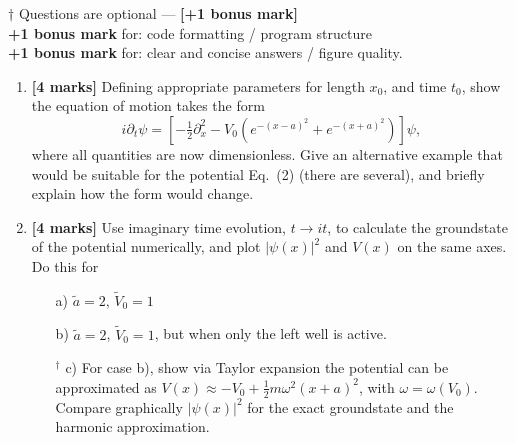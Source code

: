 \documentclass[11pt]{article}
\begin{document}
{\footnotesize{$\dagger$ Questions are optional  --- \textbf{[+1 bonus mark]} \\  \indent\textbf{+1 bonus mark} for:  code formatting / program structure  \\  \indent \textbf{+1 bonus mark} for: clear and concise answers  / figure quality. } }
\begin{enumerate}
\subsection*{Part A }
\item \textbf{[4 marks]} Defining appropriate parameters for length $x_0$, and time $t_0$, show the equation of motion takes the form
\begin{equation}
i  \partial_{t} {\psi} = \left[-\tfrac{1}{2} \partial_x^2 - {V}_0 \left( e^{-({ x} - {a})^2} + e^{-({x} + {a})^2} \right) \right] \psi,
\end{equation}
where all quantities are now dimensionless. Give an alternative example that would be suitable for the potential Eq.~(2) (there are several), and briefly explain how the form would change.

\item \textbf{[4 marks]}  Use imaginary time evolution, $t \rightarrow i t$, to calculate the groundstate of the potential numerically, and plot $|\psi(x)|^2$ and $V(x)$ on the same axes.  Do this for 
\begin{itemize}
\item[a)] $\tilde a = 2$, $\tilde V_0 = 1$
\item[b)] $\tilde a =2$, $\tilde V_0 =1$, but when only the left well is active.
\item[$^\dagger$ c)]  For case b), show via Taylor expansion  the potential can be approximated as $V(x) \approx -V_0 + \tfrac{1}{2} m \omega^2 (x+a)^2$, with $\omega = \omega(V_0)$. Compare graphically $|\psi(x)|^2$ for the exact groundstate and the harmonic approximation.
\end{itemize}




\end{enumerate}
\end{document}
